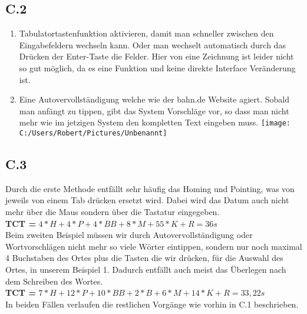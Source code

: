 \documentclass{article}
\begin{document}
	\subsection*{C.2}
		\begin{enumerate}
			\item Tabulatortastenfunktion aktivieren, damit man schneller zwischen den Eingabefeldern wechseln kann. Oder man wechselt automatisch durch das Drücken der Enter-Taste die Felder. Hier von eine Zeichnung ist leider nicht so gut möglich, da es eine Funktion und keine direkte Interface Veränderung ist.
			\item Eine Autovervollständigung welche wie der bahn.de Website agiert. Sobald man anfängt zu tippen, gibt das System Vorschläge vor, so dass man nicht mehr wie im jetzigen System den kompletten Text eingeben muss.
			\texttt{[image: C:/Users/Robert/Pictures/Unbenannt]}
		\end{enumerate}
	\subsection*{C.3}
		Durch die erste Methode entfällt sehr häufig das Homing und Pointing, was von jeweils von einem Tab drücken ersetzt wird. Dabei wird das Datum auch nicht mehr über die Maus sondern über die Tastatur eingegeben.\\
		\textbf{TCT =} $4*H + 4*P + 4*BB + 8*M + 55*K + R = 36s$\\
		Beim zweiten Beispiel müssen wir durch Autovervollständigung oder Wortvorschlägen nicht mehr so viele Wörter eintippen, sondern nur noch maximal 4 Buchstaben des Ortes plus die Tasten die wir drücken, für die Auswahl des Ortes, in unserem Beispiel 1. Dadurch entfällt auch meist das Überlegen nach dem Schreiben des Wortes.\\
		\textbf{TCT =} $7*H + 12*P + 10*BB + 2*B + 6*M + 14*K +R = 33,22s$\\
		In beiden Fällen verlaufen die restlichen Vorgänge wie vorhin in C.1 beschrieben. 
\end{document}
